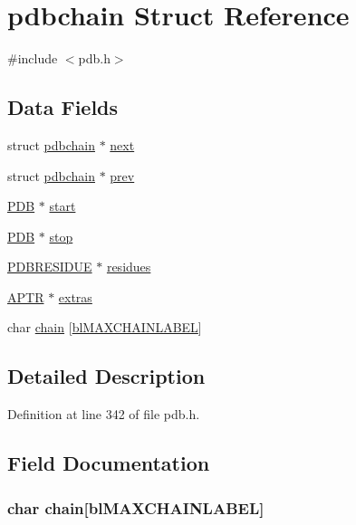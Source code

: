 \hypertarget{structpdbchain}{\section{pdbchain Struct Reference}
\label{structpdbchain}
}


{\ttfamily \#include $<$pdb.\-h$>$}

\subsection*{Data Fields}
\begin{DoxyCompactItemize}
\item 
struct \hyperlink{structpdbchain}{pdbchain} $\ast$ \hyperlink{structpdbchain_a2aede0a4c56d29f464f019d394e2a77e}{next}
\item 
struct \hyperlink{structpdbchain}{pdbchain} $\ast$ \hyperlink{structpdbchain_a12f14cc2dfeccaa7c56d29b127d53240}{prev}
\item 
\hyperlink{pdb_8h_aa31eb9fe57a50b29778e64bb131b22bf}{P\-D\-B} $\ast$ \hyperlink{structpdbchain_af9637d86382b94dc2d5afbf24ecc4a34}{start}
\item 
\hyperlink{pdb_8h_aa31eb9fe57a50b29778e64bb131b22bf}{P\-D\-B} $\ast$ \hyperlink{structpdbchain_a6d5bcaf01a13f97f8d88c5d489b48fec}{stop}
\item 
\hyperlink{pdb_8h_aff64ec8d1579f7f8af535db68ac0cb8c}{P\-D\-B\-R\-E\-S\-I\-D\-U\-E} $\ast$ \hyperlink{structpdbchain_afd542e271e187b3bd714f15fb9644915}{residues}
\item 
\hyperlink{_sys_defs_8h_a201013872f88d6f535b12e644d7f4d5a}{A\-P\-T\-R} $\ast$ \hyperlink{structpdbchain_aaa357dbbf4b88fcb1df71547b2d085a6}{extras}
\item 
char \hyperlink{structpdbchain_abe96afafc1017db40e25d4183a058bc5}{chain} \mbox{[}\hyperlink{pdb_8h_a71c7f291062e2d98b987937309365578}{bl\-M\-A\-X\-C\-H\-A\-I\-N\-L\-A\-B\-E\-L}\mbox{]}
\end{DoxyCompactItemize}


\subsection{Detailed Description}


Definition at line 342 of file pdb.\-h.



\subsection{Field Documentation}
\hypertarget{structpdbchain_abe96afafc1017db40e25d4183a058bc5}{
\subsubsection[{chain}]{\setlength{\rightskip}{0pt plus 5cm}char chain\mbox{[}{\bf bl\-M\-A\-X\-C\-H\-A\-I\-N\-L\-A\-B\-E\-L}\mbox{]}}}\label{structpdbchain_abe96afafc1017db40e25d4183a058bc5}


